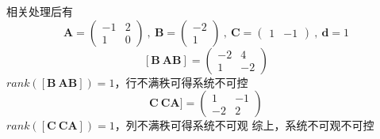 \documentclass[UTF8,a4paper]{ctexart}
\begin{document}
\section{}
相关处理后有
$$\mathbf{A}=\begin{pmatrix}
-1&2\\
1&0
\end{pmatrix}\ ,\ \mathbf{B}=\begin{pmatrix}-2\\1\end{pmatrix}\ ,\ \mathbf{C}=\begin{pmatrix}1&-1\end{pmatrix}\ , \ \mathbf{d}=1$$
$$\mathbf{[B \ AB ]}=\begin{pmatrix}
-2&4\\
1&-2
\end{pmatrix}$$
$rank(\mathbf{[B\  AB]})=1$，行不满秩可得系统不可控
$$\mathbf{C \ CA ]}=\begin{pmatrix}
1&-1\\
-2&2
\end{pmatrix}$$
$rank(\mathbf{[C\  CA]})=1$，列不满秩可得系统不可观
综上，系统不可观不可控
\end{document}
